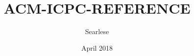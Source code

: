 \documentclass{article}
\title{ACM-ICPC-REFERENCE}
\author{ Searlese }
\date{April 2018}
\begin{document}
\maketitle
\newpage

\begin{multicols*}{2}

	\tableofcontents
	\newpage

	\begin{python}[getContents.py]
	\end{python}

\end{multicols*}
\end{document}
